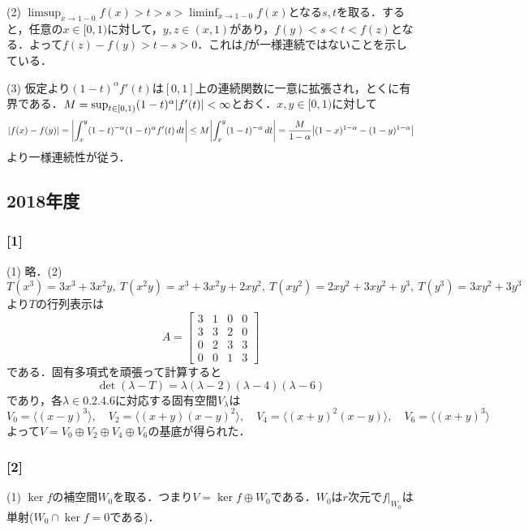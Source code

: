 \documentclass[a4j]{ltjsarticle}
\newcommand{\1}{\mathbbm{1}}
\numberwithin{equation}{section}
\theoremstyle{definition}
\begin{document}
(2) $\limsup_{x\to 1-0}f(x)>t>s>\liminf_{x\to1-0}f(x)$となる$s,t$を取る．すると，任意の$x\in[0,1)$に対して，$y,z\in(x,1)$があり，$f(y)<s<t<f(z)$となる．よって$f(z)-f(y)>t-s>0$．これは$f$が一様連続ではないことを示している．

(3) 仮定より$(1-t)^\alpha f'(t)$は$[0,1]$上の連続関数に一意に拡張され，とくに有界である．$M=\sup_{t\in [0,1)}(1-t)^\alpha \abs{f'(t)}<\infty$とおく．$x,y\in [0,1)$に対して
\begin{equation}
    \abs{f(x)-f(y)}=\abs{\int_{x}^{y} (1-t)^{-\alpha}(1-t)^\alpha f'(t)\,dt}\leq M\abs{\int_{x}^{y}(1-t)^{-\alpha}\,dt}=\frac{M}{1-\alpha}\abs{(1-x)^{1-\alpha}-(1-y)^{1-\alpha}} 
\end{equation}
より一様連続性が従う．
\subsection{2018年度}
\subsubsection*{[1]}
(1) 略．(2) $T(x^3)=3x^3+3x^2y,\ T(x^2y)=x^3+3x^2y+2xy^2,\ T(xy^2)=2xy^2+3xy^2+y^3,\ T(y^3)=3xy^2+3y^3$より$T$の行列表示は
\begin{equation}
    A=\begin{bmatrix}
        3 & 1 & 0 & 0 \\
        3 & 3 & 2 & 0 \\
        0 & 2 & 3 & 3 \\
        0 & 0 & 1 & 3 
    \end{bmatrix}
\end{equation}
である．固有多項式を頑張って計算すると
\begin{equation}
    \det(\lambda - T)=\lambda(\lambda-2)(\lambda-4)(\lambda-6)
\end{equation}
であり，各$\lambda\in\qty{0,2,4,6}$に対応する固有空間$V_{\lambda}$は
\begin{equation}
    V_{0}=\langle(x-y)^3\rangle,\quad V_{2}=\langle (x+y)(x-y)^2\rangle,\quad V_{4}=\langle (x+y)^2(x-y)\rangle,\quad V_{6}=\langle(x+y)^3\rangle
\end{equation}
よって$V=V_{0}\oplus V_{2}\oplus V_{4}\oplus V_{6}$の基底が得られた．
\subsubsection*{[2]}
(1) $\ker f$の補空間$W_{0}$を取る．つまり$V=\ker f\oplus W_{0}$である．$W_{0}$は$r$次元で$f|_{W_{0}}$は単射($W_{0}\cap \ker f=0$である)．
\end{document}
